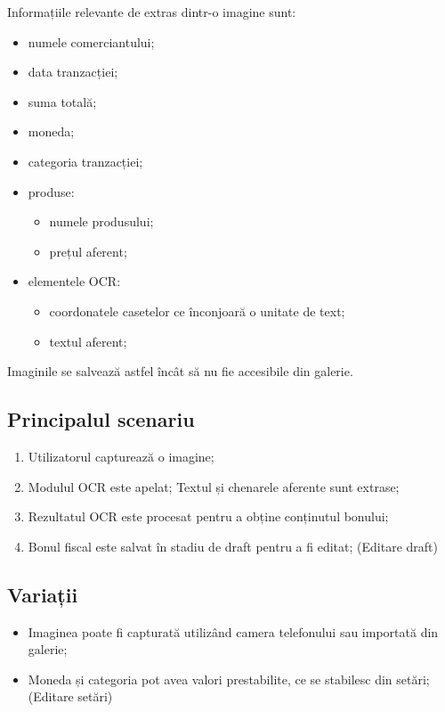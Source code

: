 Informațiile relevante de extras dintr-o imagine sunt:

\begin{itemize}
\item
  numele comerciantului;
\item
  data tranzacției;
\item
  suma totală;
\item
  moneda;
\item
  categoria tranzacției;
\item
  produse:

  \begin{itemize}
  \item
    numele produsului;
  \item
    prețul aferent;
  \end{itemize}
\item
  elementele OCR:
  \begin{itemize}
  \item
    coordonatele casetelor ce înconjoară o unitate de text;
  \item
    textul aferent;
  \end{itemize}
\end{itemize}

Imaginile se salvează astfel încât să nu fie accesibile din galerie.

\subsection{Principalul scenariu}\label{principalul-scenariu}

\begin{enumerate}
\item
  Utilizatorul capturează o imagine;
\item
  Modulul OCR este apelat; Textul și chenarele aferente sunt extrase;
\item
  Rezultatul OCR este procesat pentru a obține conținutul bonului;
\item
  Bonul fiscal este salvat în stadiu de draft pentru a fi editat;
  (Editare draft)
\end{enumerate}

\subsection{Variații}\label{variaux21bii}

\begin{itemize}
\item
  Imaginea poate fi capturată utilizând camera telefonului sau importată
  din galerie;
\item
  Moneda și categoria pot avea valori prestabilite, ce se stabilesc din
  setări; (Editare setări)
\end{itemize}

